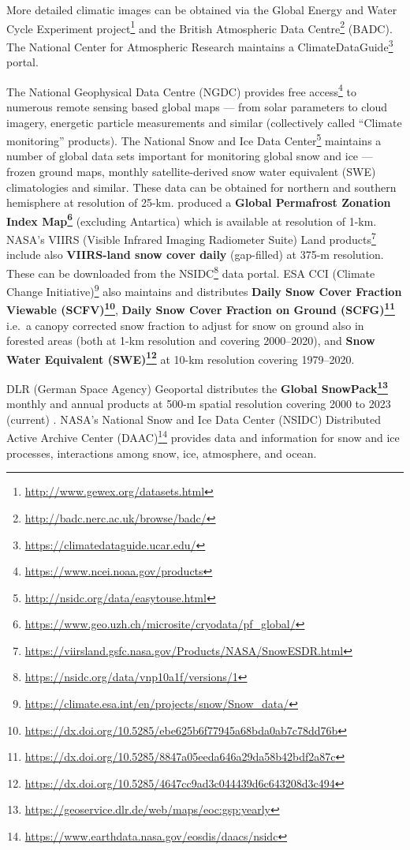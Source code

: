 \documentclass[
  graybox,natbib,nospthms]{svmono}
\renewcommand{\href}[2]{#2 (\url{#1})}
\renewcommand{\href}[2]{#2\footnote{\url{#1}}}
\begin{document}
More detailed climatic images can be obtained via the \href{http://www.gewex.org/datasets.html}{Global Energy and Water Cycle Experiment project} and the \href{http://badc.nerc.ac.uk/browse/badc/}{British Atmospheric Data Centre} (BADC). The National Center for Atmospheric Research maintains a \href{https://climatedataguide.ucar.edu/}{ClimateDataGuide} portal.

The National Geophysical Data Centre (NGDC) provides \href{https://www.ncei.noaa.gov/products}{free access}
to numerous remote sensing based global maps --- from solar parameters to cloud imagery,
energetic particle measurements and similar (collectively called ``Climate monitoring'' products).
\href{http://nsidc.org/data/easytouse.html}{The National Snow and Ice Data Center} maintains
a number of global data sets important for monitoring global snow and ice --- frozen ground maps, monthly satellite-derived snow water
equivalent (SWE) climatologies and similar. These data can be obtained for northern
and southern hemisphere at resolution of 25-km.
\citet{gruber2012derivation} produced a \textbf{\href{https://www.geo.uzh.ch/microsite/cryodata/pf_global/}{Global Permafrost Zonation Index Map}} (excluding Antartica)
which is available at resolution of 1-km.
\href{https://viirsland.gsfc.nasa.gov/Products/NASA/SnowESDR.html}{NASA's VIIRS (Visible Infrared Imaging Radiometer Suite) Land products} include also
\textbf{VIIRS-land snow cover daily} (gap-filled) at 375-m resolution. These can be downloaded from the \href{https://nsidc.org/data/vnp10a1f/versions/1}{NSIDC} data portal.
\href{https://climate.esa.int/en/projects/snow/Snow_data/}{ESA CCI (Climate Change Initiative)} also maintains and distributes
\textbf{\href{https://dx.doi.org/10.5285/ebe625b6f77945a68bda0ab7c78dd76b}{Daily Snow Cover Fraction Viewable (SCFV)}}, \textbf{\href{https://dx.doi.org/10.5285/8847a05eeda646a29da58b42bdf2a87c}{Daily Snow Cover Fraction on Ground (SCFG)}} i.e.~a canopy corrected snow fraction
to adjust for snow on ground also in forested areas (both at 1-km resolution and covering 2000--2020), and \textbf{\href{https://dx.doi.org/10.5285/4647cc9ad3c044439d6c643208d3c494}{Snow Water Equivalent (SWE)}} at 10-km resolution covering 1979--2020.

DLR (German Space Agency) Geoportal distributes the \textbf{\href{https://geoservice.dlr.de/web/maps/eoc:gsp:yearly}{Global SnowPack}} monthly
and annual products at 500-m spatial resolution covering 2000 to 2023 (current) \citep{dietz2015global}.
\href{https://www.earthdata.nasa.gov/eosdis/daacs/nsidc}{NASA's National Snow and Ice Data Center (NSIDC) Distributed Active Archive Center (DAAC)} provides data and information for snow and ice processes, interactions among snow, ice, atmosphere, and ocean.
\end{document}
